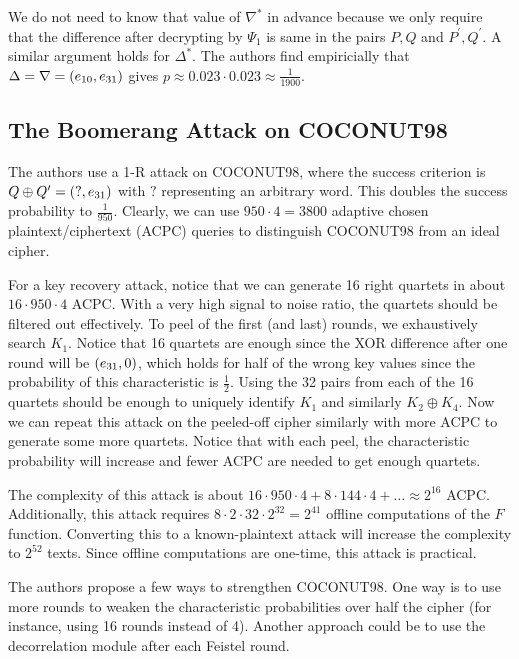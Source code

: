 \documentclass[twoside]{article}
\begin{document}
We do not need to know that value of \(\nabla^*\) in advance because we only
require that the difference after decrypting by \(\Psi_1\) is same in the pairs
\(P, Q\) and \(P^\prime, Q^\prime\). A similar argument holds for \(\Delta^*\).
The authors find empiricially that \(\Delta = \nabla = (e_{10}, e_{31})\)
gives \(p \approx 0.023 \cdot 0.023 \approx \frac{1}{1900}\).

\subsection{The Boomerang Attack on COCONUT98}
The authors use a 1-R attack on COCONUT98, where the success criterion is \(Q
\oplus Q^\prime = (?, e_{31})\) with \(?\) representing an arbitrary word.
This doubles the success probability to \(\frac{1}{950}\). Clearly, we can use
\(950 \cdot 4 = 3800\) adaptive chosen plaintext/ciphertext (ACPC) queries to
distinguish COCONUT98 from an ideal cipher.

For a key recovery attack, notice that we can generate 16 right quartets in
about \(16 \cdot 950 \cdot 4\) ACPC. With a very high signal to noise ratio, the
quartets should be filtered out effectively. To peel of the first (and last)
rounds, we exhaustively search \(K_1\). Notice that 16 quartets are enough since
the XOR difference after one round will be \((e_{31}, 0)\), which holds for
half of the wrong key values since the probability of this characteristic is
\(\frac{1}{2}\). Using the 32 pairs from each of the 16 quartets should be
enough to uniquely identify \(K_1\) and similarly \(K_2 \oplus K_4\). Now we can
repeat this attack on the peeled-off cipher similarly with more ACPC to generate
some more quartets. Notice that with each peel, the characteristic probability
will increase and fewer ACPC are needed to get enough quartets.

The complexity of this attack is about \(16 \cdot 950 \cdot 4 + 8 \cdot 144
\cdot 4 + \ldots \approx 2^{16}\) ACPC. Additionally, this attack requires \(8
\cdot 2 \cdot 32 \cdot 2^{32} = 2^{41}\) offline computations of the \(F\)
function. Converting this to a known-plaintext attack will increase the
complexity to \(2^{52}\) texts. Since offline computations are one-time, this
attack is practical.

The authors propose a few ways to strengthen COCONUT98. One way is to use more
rounds to weaken the characteristic probabilities over half the cipher (for
instance, using 16 rounds instead of 4). Another approach could be to use the
decorrelation module after each Feistel round.
\end{document}
